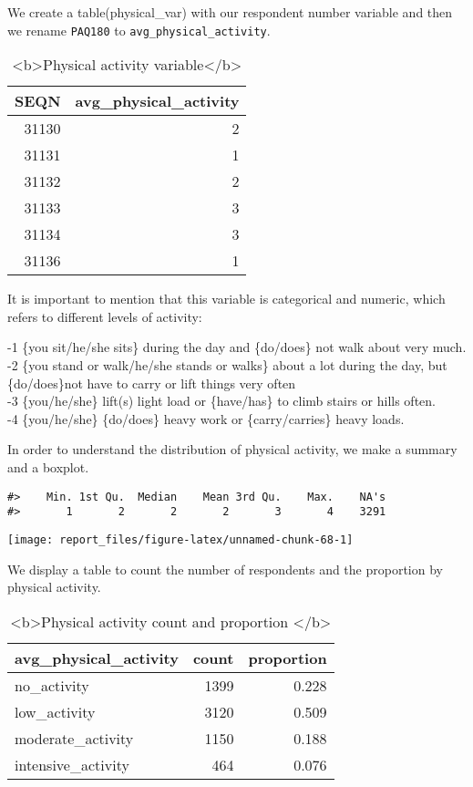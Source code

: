 \documentclass[
]{article}
\begin{document}
We create a table(physical\_var) with our respondent number variable and
then we rename \texttt{PAQ180} to \texttt{avg\_physical\_activity}.

\begin{table}

\caption{\label{tab:unnamed-chunk-67}<b>Physical activity variable</b>}
\centering
\begin{tabular}[t]{r|r}
\hline
SEQN & avg\_physical\_activity\\
\hline
31130 & 2\\
\hline
31131 & 1\\
\hline
31132 & 2\\
\hline
31133 & 3\\
\hline
31134 & 3\\
\hline
31136 & 1\\
\hline
\end{tabular}
\end{table}

It is important to mention that this variable is categorical and
numeric, which refers to different levels of activity:

-1 \{you sit/he/she sits\} during the day and \{do/does\} not walk about
very much.\\
-2 \{you stand or walk/he/she stands or walks\} about a lot during the
day, but \{do/does\}not have to carry or lift things very often\\
-3 \{you/he/she\} lift(s) light load or \{have/has\} to climb stairs or
hills often.\\
-4 \{you/he/she\} \{do/does\} heavy work or \{carry/carries\} heavy
loads.

In order to understand the distribution of physical activity, we make a
summary and a boxplot.

\begin{verbatim}
#>    Min. 1st Qu.  Median    Mean 3rd Qu.    Max.    NA's 
#>       1       2       2       2       3       4    3291
\end{verbatim}

\begin{center}\texttt{[image: report\_files/figure-latex/unnamed-chunk-68-1]} \end{center}

We display a table to count the number of respondents and the proportion
by physical activity.

\begin{table}

\caption{\label{tab:unnamed-chunk-69}<b>Physical activity count and proportion </b>}
\centering
\begin{tabular}[t]{l|r|r}
\hline
avg\_physical\_activity & count & proportion\\
\hline
no\_activity & 1399 & 0.228\\
\hline
low\_activity & 3120 & 0.509\\
\hline
moderate\_activity & 1150 & 0.188\\
\hline
intensive\_activity & 464 & 0.076\\
\hline
\end{tabular}
\end{table}
\end{document}
